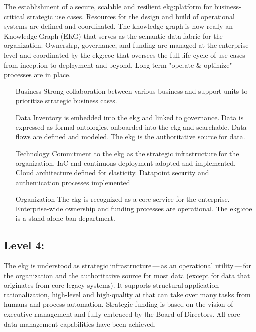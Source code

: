 The establishment of a secure, scalable and resilient \gls{ekg:platform} for business-critical strategic use cases.
Resources for the design and build of operational systems are defined and coordinated.
The knowledge graph is now really an  Knowledge Graph (EKG) that serves as the
semantic data fabric for the organization.
Ownership, governance, and funding are managed at the enterprise level and coordinated by the \gls{ekg:coe} that
oversees the full life-cycle of use cases from inception to deployment and beyond.
Long-term "operate \& optimize" processes are in place.

\begin{itemize}[leftmargin=1in,font=\bfseries]

    \item[Business]     Strong collaboration between various business and support units to prioritize
                        strategic business cases.
    \item[Data]         Inventory is embedded into the \gls{ekg} and linked to governance.
                        Data is expressed as formal ontologies, onboarded into the \gls{ekg} and searchable.
                        Data flows are defined and modeled.
                        The \gls{ekg} is the authoritative source for data.
    \item[Technology]   Commitment to the \gls{ekg} as the strategic infrastructure for the organization.
                        IaC and continuous deployment adopted and implemented.
                        Cloud architecture defined for elasticity.
                        Datapoint security and authentication processes implemented
    \item[Organization] The \gls{ekg} is recognized as a core service for the enterprise.
                        Enterprise-wide ownership and funding processes are operational.
                        The \gls{ekg:coe} is a stand-alone \gls{bau} department.
\end{itemize}

\subsection{Level 4: \ekgmmLevelFourLabel}

The \gls{ekg} is understood as strategic infrastructure\,---\,as an operational utility\,---\,for the organization
and the authoritative source for most data (except for data that originates from core legacy systems).
It supports structural application rationalization, high-level and high-quality \gls{ai}
that can take over many tasks from humans and process automation.
Strategic funding is based on the vision of executive management and fully embraced by the Board of Directors.
All core data management capabilities have been achieved.

